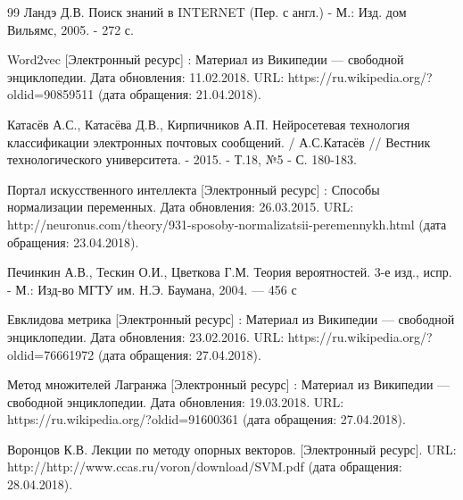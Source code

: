 \begin {thebibliography} {99}
Ландэ Д.В. Поиск знаний в INTERNET (Пер. с англ.) - М.: Изд. дом Вильямс, 2005. - 272 с.

Word2vec [Электронный ресурс] : Материал из Википедии — свободной энциклопедии. Дата обновления: 11.02.2018. URL: https://ru.wikipedia.org/?oldid=90859511 (дата обращения: 21.04.2018).

Катасёв А.С., Катасёва Д.В., Кирпичников А.П. Нейросетевая технология классификации электронных  почтовых сообщений. / А.С.Катасёв // Вестник технологического университета. - 2015. - Т.18, №5 - С. 180-183.

Портал искусственного интеллекта [Электронный ресурс] : Способы нормализации переменных. Дата обновления: 26.03.2015. URL: http://neuronus.com/theory/931-sposoby-normalizatsii-peremennykh.html (дата обращения: 23.04.2018).

Печинкин А.В., Тескин О.И., Цветкова Г.М. Теория вероятностей. 3-е изд., испр. - М.: Изд-во МГТУ им. Н.Э. Баумана, 2004. — 456 с

 Евклидова метрика [Электронный ресурс] : Материал из Википедии — свободной энциклопедии. Дата обновления: 23.02.2016. URL: https://ru.wikipedia.org/?oldid=76661972 (дата обращения: 27.04.2018).

Метод множителей Лагранжа [Электронный ресурс] : Материал из Википедии — свободной энциклопедии. Дата обновления: 19.03.2018. URL: https://ru.wikipedia.org/?oldid=91600361 (дата обращения: 27.04.2018).

\newpage
{}
Воронцов К.В. Лекции по методу опорных векторов. [Электронный ресурс]. URL: http://http://www.ccas.ru/voron/download/SVM.pdf (дата обращения: 28.04.2018).



\end {thebibliography}
%
%

